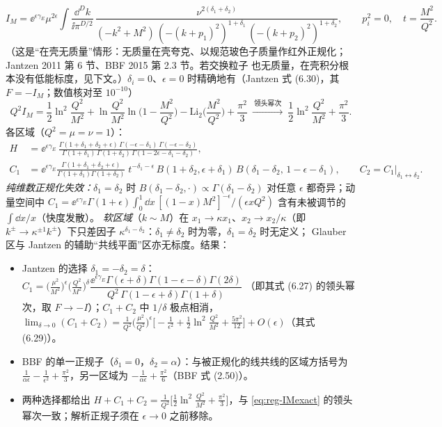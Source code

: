 \begin{equation}\label{eq:reg-IM}
I_M=\ee^{\epsilon\gamma_E}\mu^{2\epsilon}\!\int\!\frac{\dd^Dk}{\ii\pi^{D/2}}\,\frac{\nu^{2(\delta_1+\delta_2)}}{(-k^2+M^2)\,(-(k+p_1)^2)^{1+\delta_1}\,(-(k+p_2)^2)^{1+\delta_2}},\qquad
p_i^2=0,\quad t=\frac{M^2}{Q^2}.
\end{equation}
（这是“在壳无质量”情形：无质量在壳夸克、以规范玻色子质量作红外正规化；Jantzen 2011 第 6 节、BBF 2015 第 2.3 节。若交换粒子
也无质量，在壳积分根本没有低能标度，见下文。）$\delta_i=0$、$\epsilon=0$ 时精确地有（Jantzen 式 (6.30)，其 $F=-I_M$；数值核对至 $10^{-10}$）
\begin{equation}\label{eq:reg-IMexact}
Q^2I_M=\frac12\ln^2\frac{Q^2}{M^2}+\ln\frac{Q^2}{M^2}\ln\Big(1-\frac{M^2}{Q^2}\Big)-\mathrm{Li}_2\Big(\frac{M^2}{Q^2}\Big)+\frac{\pi^2}3\ \xrightarrow{\ \text{领头幂次}\ }\ \frac12\ln^2\frac{Q^2}{M^2}+\frac{\pi^2}3 .
\end{equation}
各区域（$Q^2=\mu=\nu=1$）：
\begin{align}
H&=\ee^{\epsilon\gamma_E}\,\frac{\Gamma(1+\delta_1+\delta_2+\epsilon)\,\Gamma(-\epsilon-\delta_1)\,\Gamma(-\epsilon-\delta_2)}{\Gamma(1+\delta_1)\,\Gamma(1+\delta_2)\,\Gamma(1-2\epsilon-\delta_1-\delta_2)},\nonumber\\
C_1&=\ee^{\epsilon\gamma_E}\frac{\Gamma(1+\delta_1+\delta_2+\epsilon)}{\Gamma(1+\delta_1)\Gamma(1+\delta_2)}\;t^{-\delta_1-\epsilon}\,
B(1+\delta_2,\epsilon+\delta_1)\,B(\delta_1-\delta_2,\,1-\epsilon-\delta_1),\qquad C_2=C_1\big|_{\delta_1\leftrightarrow\delta_2}.\label{eq:reg-C1M}
\end{align}
\emph{纯维数正规化失效：}$\delta_1=\delta_2$ 时 $B(\delta_1-\delta_2,\cdot)\propto\Gamma(\delta_1-\delta_2)$ 对任意 $\epsilon$ 都奇异；动量空间中
$C_1=\ee^{\epsilon\gamma_E}\Gamma(1+\epsilon)\int_0^1\dd x\,[(1-x)M^2]^{-\epsilon}/(\epsilon xQ^2)$ 含有未被调节的 $\int\dd x/x$（快度发散）。
\emph{软区域}（$k\sim M$）在 $x_1\to\kappa x_1$、$x_2\to x_2/\kappa$（即 $k^\pm\to\kappa^{\pm1}k^\pm$）下只差因子 $\kappa^{\delta_1-\delta_2}$：$\delta_1\ne\delta_2$ 时为零，$\delta_1=\delta_2$ 时无定义；
Glauber 区与 Jantzen 的辅助“共线平面”区亦无标度。结果：
\begin{itemize}[leftmargin=2em]
\item Jantzen 的选择 $\delta_1=-\delta_2=\delta$：
  $C_1=\big(\tfrac{\mu^2}{M^2}\big)^{\epsilon}\big(\tfrac{Q^2}{M^2}\big)^{\delta}\dfrac{\ee^{\epsilon\gamma_E}\Gamma(\epsilon+\delta)\Gamma(1-\epsilon-\delta)\Gamma(2\delta)}{Q^2\,\Gamma(1-\epsilon+\delta)\Gamma(1+\delta)}$
  （即其式 (6.27) 的领头幂次，取 $F\to-I$）；$C_1+C_2$ 中 $1/\delta$ 极点相消，
  $\lim_{\delta\to0}(C_1+C_2)=\frac1{Q^2}\big(\frac{\mu^2}{Q^2}\big)^\epsilon\big[-\frac1{\epsilon^2}+\frac12\ln^2\frac{Q^2}{M^2}+\frac{5\pi^2}{12}\big]+O(\epsilon)$（其式 (6.29)）。
\item BBF 的单一正规子（$\delta_1=0$，$\delta_2=\alpha$）：与被正规化的线共线的区域方括号为 $\frac1{\alpha\epsilon}-\frac1{\epsilon^2}+\frac{\pi^2}3$，另一区域为
  $-\frac1{\alpha\epsilon}+\frac{\pi^2}6$（BBF 式 (2.50)）。
\item 两种选择都给出 $H+C_1+C_2=\frac1{Q^2}\big[\frac12\ln^2\frac{Q^2}{M^2}+\frac{\pi^2}3\big]$，与 \cref{eq:reg-IMexact} 的领头幂次一致；解析正规子须在
  $\epsilon\to0$ 之前移除。
\end{itemize}
